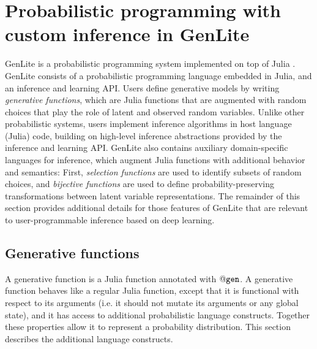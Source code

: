 \section{Probabilistic programming with custom inference in GenLite}

GenLite is a probabilistic programming system implemented on top of Julia \cite{?}.
GenLite consists of a probabilistic programming language embedded in Julia, and an inference and learning API.
Users define generative models by writing \emph{generative functions}, which are Julia functions that are augmented with random choices that play the role of latent and observed random variables.
Unlike other probabilistic systems, users implement inference algorithms in host language (Julia) code, building on high-level inference abstractions provided by the inference and learning API.
GenLite also contains auxiliary domain-specific languages for inference, which augment Julia functions with additional behavior and semantics:
First, \emph{selection functions} are used to identify subsets of random choices, and \emph{bijective functions} are used to define probability-preserving transformations between latent variable representations.
The remainder of this section provides additional details for those features of GenLite that are relevant to user-programmable inference based on deep learning.

\subsection{Generative functions}

A generative function is a Julia function annotated with $\mathtt{@gen}{}$.
A generative function behaves like a regular Julia function, except that it is functional with respect to its arguments (i.e. it should not mutate its arguments or any global state), and it has access to additional probabilistic language constructs.
Together these properties allow it to represent a probability distribution.
This section describes the additional language constructs.

